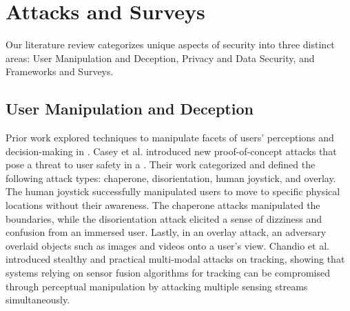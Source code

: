 \section{\MR Attacks and Surveys}
\label{sec:relwork}
Our literature review categorizes unique aspects of \MR security into three distinct areas: User Manipulation and Deception, Privacy and Data Security, and Frameworks and Surveys.

\subsection{User Manipulation and Deception}

Prior work explored techniques to manipulate facets of users' perceptions and decision-making in \MR. 
Casey et al. \cite{Casey_2021} introduced new proof-of-concept attacks that pose a threat to user safety in a \VE. Their work categorized and defined the following attack types: chaperone, disorientation, human joystick, and overlay. The human joystick successfully manipulated users to move to specific physical locations without their awareness. The chaperone attacks manipulated the \VE boundaries, while the disorientation attack elicited a sense of dizziness and confusion from an immersed \VR user. Lastly, in an overlay attack, an adversary overlaid objects such as images and videos onto a user’s \VR view.
Chandio et al.~\cite{chandio2024stealthy} introduced stealthy and practical multi-modal attacks on \MR tracking, showing that \MR systems relying on sensor fusion algorithms for tracking can be compromised through perceptual manipulation by attacking multiple sensing streams simultaneously.

